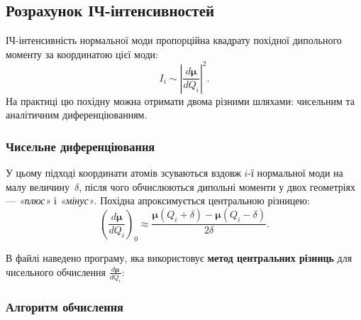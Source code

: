 \subsection{Розрахунок ІЧ-інтенсивностей}

ІЧ-інтенсивність нормальної моди пропорційна квадрату похідної дипольного моменту
за координатою цієї моди:
\begin{equation*}
    I_i \sim \left| \frac{d\boldsymbol{\mu}}{dQ_i} \right|^2.
\end{equation*}
На практиці цю похідну можна отримати двома різними шляхами: чисельним та аналітичним диференціюванням.

\subsubsection{Чисельне диференціювання}

У цьому підході координати атомів зсуваються вздовж $i$-ї нормальної моди
на малу величину~$\delta$, після чого обчислюються дипольні моменти
у двох геометріях --- \emph{«плюс»} і \emph{«мінус»}.
Похідна апроксимується центральною різницею:
\begin{equation*}
    \left( \frac{d\boldsymbol{\mu}}{dQ_i} \right)_0 \approx
    \frac{\boldsymbol{\mu}(Q_i+\delta) - \boldsymbol{\mu}(Q_i-\delta)}{2\delta}.
\end{equation*}

В файлі  наведено програму, яка  використовує \textbf{метод центральних різниць} для чисельного обчислення $\frac{d\boldsymbol{\mu}}{dQ_i}$:


\subsubsection{Алгоритм обчислення}

